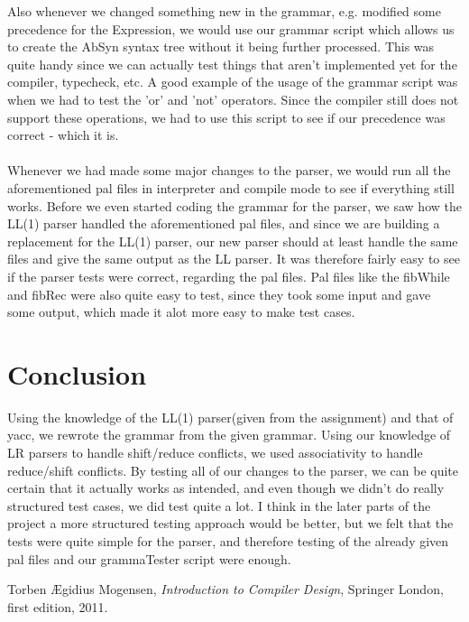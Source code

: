 \documentclass[12pt,a4paper]{article}
\begin{document}
Also whenever we changed something new in the grammar, e.g. modified some precedence for the Expression, we would use our grammar
script which allows us to create the AbSyn syntax tree without it being further processed. This was quite handy since we can actually
test things that aren't implemented yet for the compiler, typecheck, etc. A good example of the usage of the grammar script was
when we had to test the 'or' and 'not' operators. Since the compiler still does not support these operations, we had to use this script
to see if our precedence was correct - which it is.
\\
\\
Whenever we had made some major changes to the parser, we would run all the aforementioned pal files
in interpreter and compile mode to see if everything still works. Before we even started coding the grammar for the parser, we 
saw how the LL(1) parser handled the aforementioned pal files, and since we are building a replacement for the LL(1) parser, our new
parser should at least handle the same files and give the same output as the LL parser. It was therefore fairly easy to see if the parser
tests were correct, regarding the pal files. Pal files like the fibWhile and fibRec were also quite easy to test, since they took some
input and gave some output, which made it alot more easy to make test cases.


\section{Conclusion}
Using the knowledge of the LL(1) parser(given from the assignment) and that of yacc, we rewrote the grammar from the given grammar. Using our knowledge of LR parsers to handle shift/reduce conflicts, we used associativity to handle reduce/shift conflicts. By testing all 
of our changes to the parser, we can be quite certain that it actually works as intended, and even though we didn't do really structured
test cases, we did test quite a lot. I think in the later parts of the project a more structured testing approach would be better, but
we felt that the tests were quite simple for the parser, and therefore testing of the already given pal files and our grammaTester script were enough.

\begin{thebibliography}{9}
    Torben Ægidius Mogensen,
    \emph{Introduction to Compiler Design},
    Springer London, first edition, 2011.
\end{thebibliography}
\end{document}
